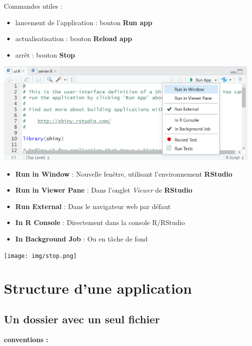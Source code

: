 \documentclass[
]{article}
\providecommand{\tightlist}{%
  \setlength{\itemsep}{0pt}\setlength{\parskip}{0pt}}
\begin{document}
Commandes utiles :

\begin{itemize}
\tightlist
\item
  lancement de l'application : bouton \textbf{Run app}
\item
  actualisatisation : bouton \textbf{Reload app}
\item
  arrêt : bouton \textbf{Stop}
\end{itemize}

\includegraphics{img/run_app.png}

\begin{itemize}
\tightlist
\item
  \textbf{Run in Window} : Nouvelle fenêtre, utilisant l'environnement
  \textbf{RStudio}
\item
  \textbf{Run in Viewer Pane} : Dans l'onglet \emph{Viewer} de
  \textbf{RStudio}
\item
  \textbf{Run External} : Dans le navigateur web par défaut
\item
  \textbf{In R Console} : Directement dans la console R/RStudio
\item
  \textbf{In Background Job} : Ou en tâche de fond
\end{itemize}

\texttt{[image: img/stop.png]}

\hypertarget{structure-dune-application}{%
\section{Structure d'une application}\label{structure-dune-application}}

\hypertarget{un-dossier-avec-un-seul-fichier}{%
\subsection{Un dossier avec un seul
fichier}\label{un-dossier-avec-un-seul-fichier}}

\textbf{conventions :}
\end{document}
